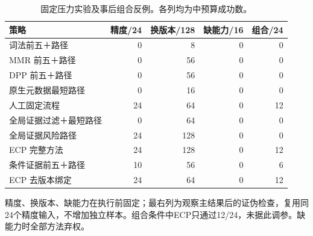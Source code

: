 \begin{table}[t]
\caption{固定压力实验及事后组合反例。各列均为中预算成功数。}\label{tab:network-stress}
\centering\small
\begin{tabularx}{\textwidth}{Xrrrr}
\toprule
策略 & 精度/24 & 换版本/128 & 缺能力/16 & 组合/24 \\
\midrule
词法前五＋路径 & 0 & 8 & 0 & 0 \\
MMR 前五＋路径 & 0 & 56 & 0 & 0 \\
DPP 前五＋路径 & 0 & 56 & 0 & 0 \\
原生元数据最短路径 & 0 & 16 & 0 & 0 \\
人工固定流程 & 24 & 64 & 0 & 12 \\
全局证据过滤＋最短路径 & 0 & 64 & 0 & 0 \\
全局证据风险路径 & 24 & 128 & 0 & 0 \\
ECP 完整方法 & 24 & 128 & 0 & 12 \\
条件证据前五＋路径 & 10 & 56 & 0 & 6 \\
ECP 去版本绑定 & 24 & 64 & 0 & 12 \\
\bottomrule
\end{tabularx}
\par\vspace{3pt}\raggedright\footnotesize 精度、换版本、缺能力在执行前固定；最右列为观察主结果后的证伪检查，复用同24个精度输入，不增加独立样本。组合条件中ECP只通过12/24，未据此调参。缺能力时全部方法弃权。
\end{table}
